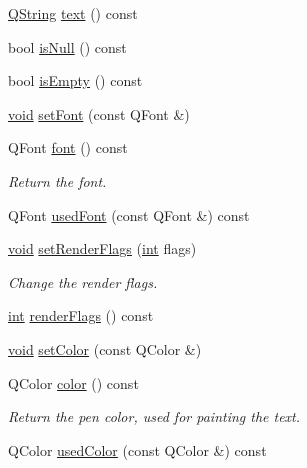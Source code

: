 \begin{DoxyCompactItemize}
\item 
\hyperlink{group___u_a_v_objects_plugin_gab9d252f49c333c94a72f97ce3105a32d}{Q\-String} \hyperlink{class_qwt_text_a15a42a83153f82bab8cfc283d090d736}{text} () const 
\item 
bool \hyperlink{class_qwt_text_afdf53f75d1b8ce6f2f0b00df59fa0177}{is\-Null} () const 
\item 
bool \hyperlink{class_qwt_text_a25843b1120b648752ed5be2247ebe43f}{is\-Empty} () const 
\item 
\hyperlink{group___u_a_v_objects_plugin_ga444cf2ff3f0ecbe028adce838d373f5c}{void} \hyperlink{class_qwt_text_ad071f3c4fae4512a1cc71554d95eb69a}{set\-Font} (const Q\-Font \&)
\item 
Q\-Font \hyperlink{class_qwt_text_a76db41eeae98fbfa0933a38328a240ac}{font} () const 
\begin{DoxyCompactList}\small\item\em Return the font. \end{DoxyCompactList}\item 
Q\-Font \hyperlink{class_qwt_text_a9769ab68a4fe26025c4172a14092f792}{used\-Font} (const Q\-Font \&) const 
\item 
\hyperlink{group___u_a_v_objects_plugin_ga444cf2ff3f0ecbe028adce838d373f5c}{void} \hyperlink{class_qwt_text_a2e71d427de766455323794f27d369a5d}{set\-Render\-Flags} (\hyperlink{ioapi_8h_a787fa3cf048117ba7123753c1e74fcd6}{int} flags)
\begin{DoxyCompactList}\small\item\em Change the render flags. \end{DoxyCompactList}\item 
\hyperlink{ioapi_8h_a787fa3cf048117ba7123753c1e74fcd6}{int} \hyperlink{class_qwt_text_a59c6bf54af867ce5632a07117fe442e1}{render\-Flags} () const 
\item 
\hyperlink{group___u_a_v_objects_plugin_ga444cf2ff3f0ecbe028adce838d373f5c}{void} \hyperlink{class_qwt_text_ac7de5839a5c3b1ee367cfbd5691aa105}{set\-Color} (const Q\-Color \&)
\item 
Q\-Color \hyperlink{class_qwt_text_a8904020d2a906c4c66d8515ba47820fe}{color} () const 
\begin{DoxyCompactList}\small\item\em Return the pen color, used for painting the text. \end{DoxyCompactList}\item 
Q\-Color \hyperlink{class_qwt_text_a1496bcc9225230c4da25ea73ba0a345a}{used\-Color} (const Q\-Color \&) const 
\item 

\end{DoxyCompactItemize}
